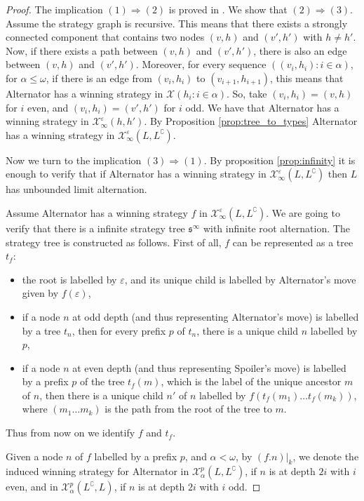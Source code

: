\documentclass{llncs}
\begin{document}
\begin{proof}
The implication $(1) \Rightarrow (2)$ is proved in \cite{bp}.  
We show that $(2) \Rightarrow (3)$. Assume the strategy graph is recursive. This means that there exists a strongly connected component that contains two nodes $(v, h)$ and $(v', h')$ with $h \neq h'$. 
Now, if there exists a path between $(v, h)$ and $(v', h')$, there is also an edge between $(v, h)$ and $(v', h')$. 
Moreover, for every sequence $((v_i,h_i) : i \in \alpha)$, for $\alpha \leq \omega$, if there is an edge from $(v_i, h_i)$ to $(v_{i+1}, h_{i+1})$, this means that Alternator has a winning strategy in $\mathcal{X}(h_i: i \in \alpha)$. So, take $(v_i, h_i)= (v,h)$ for $i$ even, and $(v_i, h_i)= (v',h')$ for $i$ odd. We have that Alternator has a winning strategy in $\mathcal{X}^\varepsilon_\infty(h, h')$. By Proposition \ref{prop:tree_to_types}
Alternator has a winning strategy in  $\mathcal{X}^\varepsilon_\infty(L, L^\complement)$.


Now we turn to the implication  $(3) \Rightarrow (1)$. 
By proposition \ref{prop:infinity} it is enough to verify that 
 if Alternator has a winning strategy in $\mathcal{X}^\varepsilon_\infty(L, L^\complement)$ then $L$ has unbounded limit alternation.
 
Assume Alternator has a winning strategy $f$ in  $\mathcal{X}^\varepsilon_\infty(L, L^\complement)$. We are going to verify that there is a infinite strategy tree $\mathfrak{s}^\infty$ with infinite root alternation. The strategy tree is constructed as follows. First of all, $f$ can be represented as a tree $t_f$: 
\begin{itemize}
\item the root is labelled by $\varepsilon$, and its unique child is labelled by Alternator's move given by $f(\varepsilon)$,
\item if a node $n$ at odd depth (and thus representing Alternator's move) is labelled by a tree $t_n$, then for every prefix $p$ of $t_n$, there is a unique child $n$ labelled by $p$,
\item if a node $n$ at even depth (and thus representing Spoiler's move) is labelled by a prefix $p$ of the tree $t_f(m)$, which is the label of the unique ancestor $m$ of $n$, then there is a unique child $n'$ of $n$ labelled by $f(t_f(m_1)\dots t_f(m_k))$, where $(m_1\dots m_k)$ is the path from the root of the tree to $m$.
\end{itemize}
Thus from now on we identify $f$ and $t_f$.

Given a node $n$ of $f$ labelled by a prefix $p$, and $\alpha < \omega$,  by $(f.n)|_k$, we denote the induced  winning strategy  for Alternator in  $\mathcal{X}^p_\alpha(L, L^\complement)$, if $n$ is at depth $2i$ with $i$ even, and in  $\mathcal{X}^p_\alpha(L^\complement, L)$, if $n$ is at depth $2i$ with $i$ odd.


\end{proof}
\end{document}
